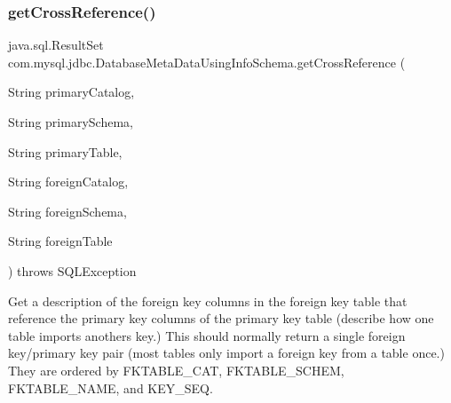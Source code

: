 \subsubsection{\texorpdfstring{get\+Cross\+Reference()}{getCrossReference()}}
{\footnotesize\ttfamily java.\+sql.\+Result\+Set com.\+mysql.\+jdbc.\+Database\+Meta\+Data\+Using\+Info\+Schema.\+get\+Cross\+Reference (\begin{DoxyParamCaption}\item[{String}]{primary\+Catalog,  }\item[{String}]{primary\+Schema,  }\item[{String}]{primary\+Table,  }\item[{String}]{foreign\+Catalog,  }\item[{String}]{foreign\+Schema,  }\item[{String}]{foreign\+Table }\end{DoxyParamCaption}) throws S\+Q\+L\+Exception}

Get a description of the foreign key columns in the foreign key table that reference the primary key columns of the primary key table (describe how one table imports another\textquotesingle{}s key.) This should normally return a single foreign key/primary key pair (most tables only import a foreign key from a table once.) They are ordered by F\+K\+T\+A\+B\+L\+E\+\_\+\+C\+AT, F\+K\+T\+A\+B\+L\+E\+\_\+\+S\+C\+H\+EM, F\+K\+T\+A\+B\+L\+E\+\_\+\+N\+A\+ME, and K\+E\+Y\+\_\+\+S\+EQ. 

